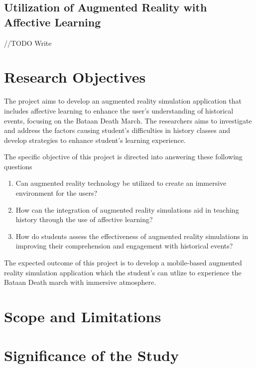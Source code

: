 \subsection{Utilization of Augmented Reality with Affective Learning}
//TODO Write


\section{Research Objectives}
The project aims to develop an augmented reality simulation application that includes affective learning to enhance the user's understanding of historical events, focusing on the Bataan Death March. The researchers aims to investigate and address the factors causing student's difficulties in history classes and develop strategies to enhance student's learning experience.

The specific objective of this project is directed into answering these following questions
\begin{enumerate}
    \item Can augmented reality technology be utilized to create an immersive environment for the users?
    \item How can the integration of augmented reality simulations aid in teaching history through the use of affective learning?
    \item How do students assess the effectiveness of augmented reality simulations in improving their comprehension and engagement with historical events? 
\end{enumerate}

The expected outcome of this project is to develop a mobile-based augmented reality simulation application which the student's can utlize to experience the Bataan Death march with immersive atmosphere.




\section{Scope and Limitations}

\section{Significance of the Study}